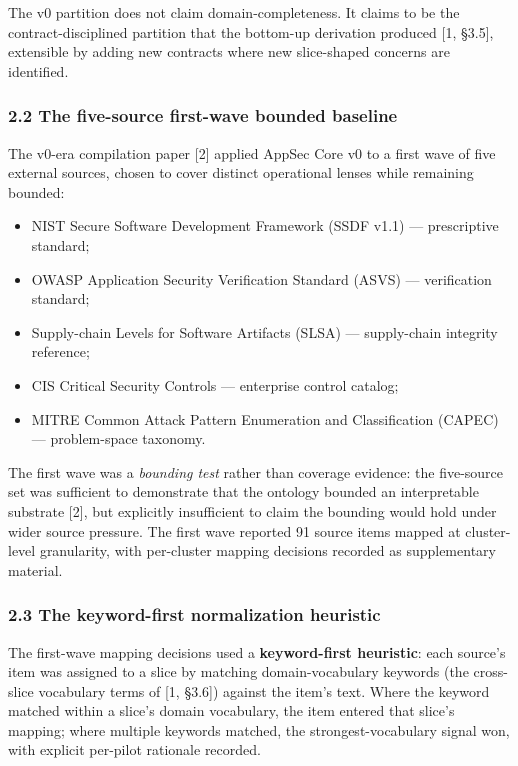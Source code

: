 \documentclass[
]{article}
\providecommand{\tightlist}{%
  \setlength{\itemsep}{0pt}\setlength{\parskip}{0pt}}
\begin{document}
The v0 partition does not claim domain-completeness. It claims to be the
contract-disciplined partition that the bottom-up derivation produced
{[}1, §3.5{]}, extensible by adding new contracts where new slice-shaped
concerns are identified.

\subsubsection{2.2 The five-source first-wave bounded
baseline}\label{the-five-source-first-wave-bounded-baseline}

The v0-era compilation paper {[}2{]} applied AppSec Core v0 to a first
wave of five external sources, chosen to cover distinct operational
lenses while remaining bounded:

\begin{itemize}
\tightlist
\item
  NIST Secure Software Development Framework (SSDF v1.1) ---
  prescriptive standard;
\item
  OWASP Application Security Verification Standard (ASVS) ---
  verification standard;
\item
  Supply-chain Levels for Software Artifacts (SLSA) --- supply-chain
  integrity reference;
\item
  CIS Critical Security Controls --- enterprise control catalog;
\item
  MITRE Common Attack Pattern Enumeration and Classification (CAPEC) ---
  problem-space taxonomy.
\end{itemize}

The first wave was a \emph{bounding test} rather than coverage evidence:
the five-source set was sufficient to demonstrate that the ontology
bounded an interpretable substrate {[}2{]}, but explicitly insufficient
to claim the bounding would hold under wider source pressure. The first
wave reported 91 source items mapped at cluster-level granularity, with
per-cluster mapping decisions recorded as supplementary material.

\subsubsection{2.3 The keyword-first normalization
heuristic}\label{the-keyword-first-normalization-heuristic}

The first-wave mapping decisions used a \textbf{keyword-first
heuristic}: each source's item was assigned to a slice by matching
domain-vocabulary keywords (the cross-slice vocabulary terms of {[}1,
§3.6{]}) against the item's text. Where the keyword matched within a
slice's domain vocabulary, the item entered that slice's mapping; where
multiple keywords matched, the strongest-vocabulary signal won, with
explicit per-pilot rationale recorded.
\end{document}
